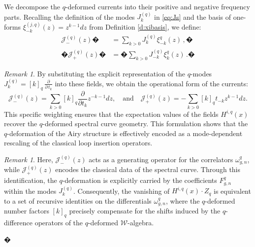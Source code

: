 \documentclass[reqno,11pt]{amsart}
\theoremstyle{plain}
\theoremstyle{definition}
\theoremstyle{remark}
\newtheorem{remark}[theorem]{Remark}
\numberwithin{equation}{section}
\newcommand{\1}{\mathds{1}}
\newcommand{\2}{\frac{1}{2}}
\begin{document}
{								We decompose the $q$-deformed currents into their positive and negative frequency parts. Recalling the definition of the modes $J^{(q)}_k$ in \eqref{eq:Js} and the basis of one-forms $\xi^{(j,q)}_{-k}(z)=z^{k-1}dz$ from Definition \ref{d:xibasis}, we define:
								\begin{align}
									\mathcal{J}^{(q)}_-(z)� &=  \sum_{k>0} J^{(q)}_k \xi^q_{-k}(z)\label{J1}\,, � \\ � \mathcal{J}^{(q)}_+(z) � &= � \sum_{k>0} J^{(q)}_{-k} \xi^q_k (z)\label{J2}\,. � \end{align}
								\begin{remark}
									By substituting the explicit representation of the $q$-modes $J^{(q)}_k=[k]_q\,\frac{\partial}{\partial\,t_k}$ into these fields, we obtain the operational form of the currents:
									\begin{equation}
										\mathcal{J}^{(q)}_-(z) = \sum_{k>0} [k]_q \frac{\partial}{\partial t_k} z^{-k-1} dz, \quad \text{and} \quad \mathcal{J}^{(q)}_+(z) = -\sum_{k>0} [k]_q t_{-k} z^{k-1} dz.
									\end{equation}
									This specific weighting ensures that the expectation values of the fields $H^{i,q}(x)$ recover the $q$-deformed spectral curve geometry. This formulation shows that the $q$-deformation of the Airy structure is effectively encoded as a mode-dependent rescaling of the classical loop insertion operators.
								\end{remark}
								\begin{remark}
									Here, $\mathcal{J}^{(q)}_-(z)$ acts as a generating operator for the correlators $\omega^q_{g,n}$, while $\mathcal{J}^{(q)}_+(z)$ encodes the classical data of the spectral curve. Through this identification, the $q$-deformation is explicitly carried by the coefficients $F^q_{g,n}$ within the modes $J^{(q)}_k$. Consequently, the vanishing of $H^{i,q}(x)\cdot Z_q$ is equivalent to a set of recursive identities on the differentials $\omega^q_{g,n}$, where the $q$-deformed number factors $[k]_q$ precisely compensate for the shifts induced by the $q$-difference operators of the $q$-deformed $\mathcal{W}$-algebra.
								\end{remark} 	� 
								
}
\end{document}
